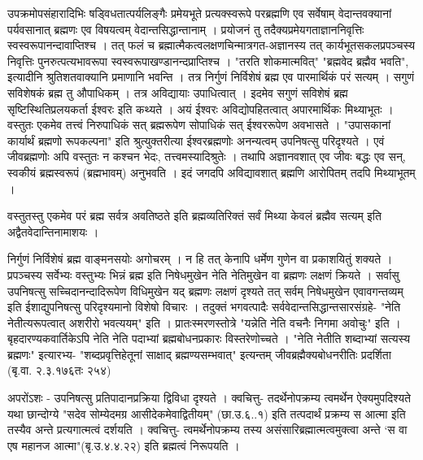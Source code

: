 उपक्रमोपसंहारादिभिः षड्विधतात्पर्यलिङ्गैः प्रमेयभूते प्रत्यक्स्वरूपे परब्रह्मणि एव सर्वेषाम् वेदान्तवक्यानां पर्यवसानात् ब्रह्मणः एव विषयत्वम् वेदान्तसिद्धान्तानाम् । प्रयोजनं तु तदैक्यप्रमेयगताज्ञाननिवृत्तिः स्वस्वरूपानन्दावाप्तिश्च । तत् फलं च ब्रह्मात्मैकत्वलक्षणचिन्मात्रगत-अज्ञानस्य तत् कार्यभूतसकलप्रपञ्चस्य निवृत्तिः पुनरुत्पत्यभावरूपा स्वस्वरूपाखण्डानन्दप्राप्तिश्च । "तरति शोकमात्मवित्" "ब्रह्मवेद ब्रह्मैव भवति", इत्यादीनि श्रुतिशतवाक्यानि प्रमाणानि भवन्ति । तत्र निर्गुणं निर्विशेषं ब्रह्म एव पारमार्थिकं परं सत्यम् । सगुणं सविशेषकं ब्रह्म तु औपाधिकम् । तत्र अविद्यायाः उपाधित्वात् । इदमेव सगुणं सविशेषं ब्रह्म सृष्टिस्थितिप्रलयकर्ता ईश्वरः इति कथ्यते । अयं ईश्वरः अविद्योपहितत्वात् अपारमार्थिकः मिथ्याभूतः । वस्तुतः एकमेव तत्त्वं निरुपाधिकं सत् ब्रह्मरूपेण सोपाधिकं सत् ईश्वररूपेण अवभासते । "उपासकानां कार्यार्थं ब्रह्मणो रूपकल्पना" इति श्रुत्युक्तरीत्या ईश्वरब्रह्मणोः अनन्यत्वम् उपनिषत्सु परिदृश्यते । एवं जीवब्रह्मणोः अपि वस्तुतः न कश्चन भेदः, तत्त्वमस्यादिश्रुतेः । तथापि अज्ञानवशात् एव जीवः बद्धः एव सन्, स्वकीयं ब्रह्मस्वरूपं (ब्रह्मभावम्) अनुभवति । इदं जगदपि अविद्यावशात् ब्रह्मणि आरोपितम् तदपि मिथ्याभूतम् ।

वस्तुतस्तु एकमेव परं ब्रह्म सर्वत्र अवतिष्ठते इति ब्रह्मव्यतिरिक्तं सर्वं मिथ्या केवलं ब्रह्मैव सत्यम् इति अद्वैतवेदान्तिनामाशयः ।

निर्गुणं निर्विशेषं ब्रह्म वाङ्मनसयोः अगोचरम् । न हि तत् केनापि धर्मेण गुणेन वा प्रकाशयितुं शक्यते । प्रपञ्चस्य सर्वेभ्यः वस्तुभ्यः भिन्नं ब्रह्म इति निषेधमुखेन नेति नेतिमुखेन वा ब्रह्मणः लक्षणं क्रियते । सर्वासु उपनिषत्सु सच्चिदानन्दादिरूपेण विधिमुखेन यद् ब्रह्मणः लक्षणं दृश्यते तत् सर्वम् निषेधमुखेन एवावगन्तव्यम् इति ईशाद्युपनिषत्सु परिदृश्यमानो विशेषो विचारः । तदुक्तं भगवत्पादैः सर्ववेदान्तसिद्धान्तसारसंग्रहे- "नेति नेतीत्यरूपत्वात् अशरीरो भवत्ययम्" इति । प्रातःस्मरणस्तोत्रे "यन्नेति नेति वचनैः निगमा अवोचुः" इति । बृहदारण्यकवार्तिकेऽपि नेति नेति पदाभ्यां ब्रह्मबोधनप्रकारः विस्तरेणोच्चते । "नेति नेतीति शब्दाभ्यां सत्यस्य ब्रह्मणः" इत्यारभ्य- "शब्दप्रवृत्तिहेतूनां साक्षाद् ब्रह्मण्यसम्भवात्" इत्यन्तम् जीवब्रह्मैक्यबोधनरीतिः प्रदर्शिता (बृ.वा. २.३.१७६तः २५४)

अपरोंऽशः - उपनिषत्सु प्रतिपादानप्रक्रिया द्विविधा दृश्यते । क्वचित्तु- तदर्थेनोपक्रम्य त्वमर्थेन ऐक्यमुपदिश्यते यथा छान्दोग्ये "सदेव सोम्येदमग्र आसीदेकमेवाद्वितीयम्" (छा.उ.६..१) इति तत्पदार्थं प्रक्रम्य स आत्मा इति तस्यैव अन्ते प्रत्यगात्मत्वं दर्शयति । क्वचित्तु- त्वमर्थेनोपक्रम्य तस्य असंसारिब्रह्मात्मत्वमुक्त्वा अन्ते ‘स वा एष महानज आत्मा"(बृ.उ.४.४.२२) इति ब्रह्मत्वं निरूपयति ।

